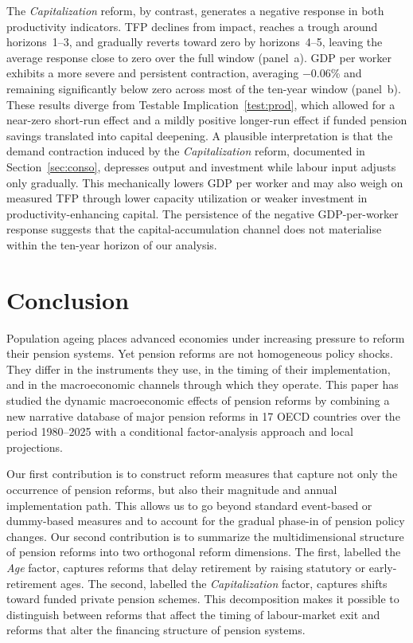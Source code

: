 \documentclass[11pt,english,a4paper, twoside, authoryear]{article}
\begin{document}
The \textit{Capitalization} reform, by contrast, generates a negative response in both productivity indicators. TFP declines from impact, reaches a trough around horizons~1--3, and gradually reverts toward zero by horizons~4--5, leaving the average response close to zero over the full window (panel~a). GDP per worker exhibits a more severe and persistent contraction, averaging $-$0.06\% and remaining significantly below zero across most of the ten-year window (panel~b). These results diverge from Testable Implication~\ref{test:prod}, which allowed for a near-zero short-run effect and a mildly positive longer-run effect if funded pension savings translated into capital deepening. A plausible interpretation is that the demand contraction induced by the \textit{Capitalization} reform, documented in Section~\ref{sec:conso}, depresses output and investment while labour input adjusts only gradually. This mechanically lowers GDP per worker and may also weigh on measured TFP through lower capacity utilization or weaker investment in productivity-enhancing capital. The persistence of the negative GDP-per-worker response suggests that the capital-accumulation channel does not materialise within the ten-year horizon of our analysis.

\FloatBarrier

\section{Conclusion}
\label{sec:conclusion}

Population ageing places advanced economies under increasing pressure to reform their pension systems. Yet pension reforms are not homogeneous policy shocks. They differ in the instruments they use, in the timing of their implementation, and in the macroeconomic channels through which they operate. This paper has studied the dynamic macroeconomic effects of pension reforms by combining a new narrative database of major pension reforms in 17 OECD countries over the period 1980--2025 with a conditional factor-analysis approach and local projections.

Our first contribution is to construct reform measures that capture not only the occurrence of pension reforms, but also their magnitude and annual implementation path. This allows us to go beyond standard event-based or dummy-based measures and to account for the gradual phase-in of pension policy changes. Our second contribution is to summarize the multidimensional structure of pension reforms into two orthogonal reform dimensions. The first, labelled the \emph{Age} factor, captures reforms that delay retirement by raising statutory or early-retirement ages. The second, labelled the \emph{Capitalization} factor, captures shifts toward funded private pension schemes. This decomposition makes it possible to distinguish between reforms that affect the timing of labour-market exit and reforms that alter the financing structure of pension systems.
\end{document}
